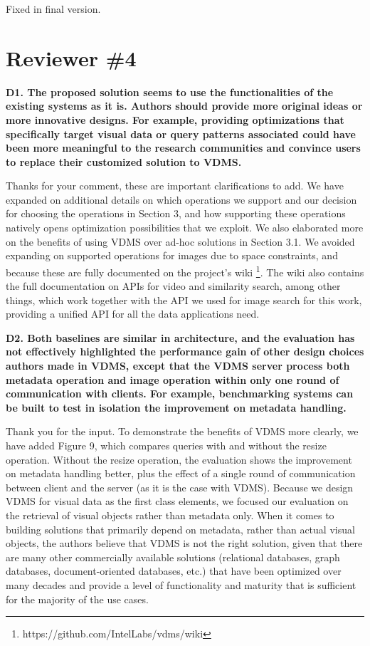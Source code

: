 \documentclass[11pt]{proposalnsf}
\begin{document}
Fixed in final version.

\bigskip

\newpage
\section{Reviewer \#4}

\noindent %
\textbf{
D1. The proposed solution seems to use the functionalities of the existing systems
as it is. Authors should provide more original ideas or more innovative designs.
For example, providing optimizations that specifically target visual data or query
patterns associated could have been more meaningful to the research communities and
convince users to replace their customized solution to VDMS.
}\bigskip

Thanks for your comment, these are important clarifications to add.
We have expanded on additional details on which operations we support and our
decision for choosing the operations in Section 3, and how supporting
these operations natively opens optimization possibilities that we exploit.
We also elaborated more on the benefits of
using VDMS over ad-hoc solutions in Section 3.1.
We avoided expanding on supported operations for images due to space constraints,
and because these are fully documented on the project's wiki
\footnote{https://github.com/IntelLabs/vdms/wiki}.
The wiki also contains the full documentation on APIs for video and similarity
search, among other things, which work together with the API we used for
image search for this work, providing a unified API for all the data applications need.

\bigskip
\noindent %
\textbf{
D2. Both baselines are similar in architecture, and the evaluation has not effectively
highlighted the performance gain of other design choices authors made in VDMS,
except that the VDMS server process both metadata operation and image operation
within only one round of communication with clients.
For example, benchmarking systems can be built to test in isolation the
improvement on metadata handling.
}\bigskip

Thank you for the input.
To demonstrate the benefits of VDMS more clearly, we have added Figure 9,
which compares queries with and without the resize operation.
Without the resize operation, the evaluation shows the
improvement on metadata handling better, plus the effect of a single round
of communication between client and the server (as it is the case with VDMS).
Because we design VDMS for visual data as the first class elements,
we focused our evaluation on the retrieval of visual objects rather
than metadata only.
When it comes to building solutions that primarily depend on metadata,
rather than actual visual objects, the authors believe that VDMS is not
the right solution, given that there are many other commercially available
solutions (relational databases, graph databases, document-oriented databases, etc.)
that have been optimized over many decades and provide a level of
functionality and maturity that is sufficient for the majority of the use cases.
\end{document}
